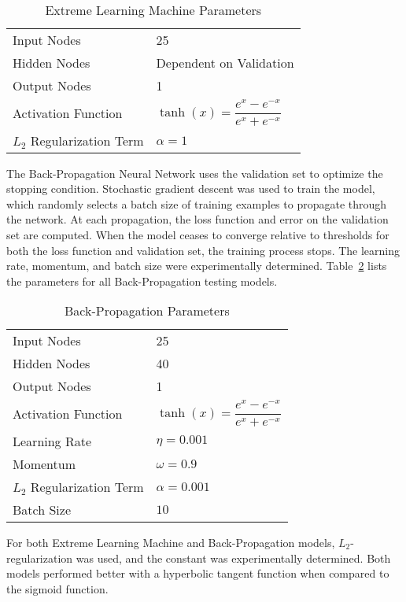 \begin{table}
\caption{Extreme Learning Machine Parameters}
\label{tab:elm-param}
	\begin{tabular}{ll}
	\toprule
	Input Nodes			   & 25 \\
	Hidden Nodes           & Dependent on Validation \\
	Output Nodes		   & 1 \\
	Activation Function    & $\tanh(x)=\dfrac{e^x - e^{-x}}{e^x + e^{-x}}$\\
	$L_2$ Regularization Term & $\alpha=1$\\
	\bottomrule
	\end{tabular}
\end{table}

The Back-Propagation Neural Network uses the validation set to optimize the stopping condition.
Stochastic gradient descent was used to train the model, which randomly selects a batch size of training examples to propagate through the network.
At each propagation, the loss function and error on the validation set are computed.
When the model ceases to converge relative to thresholds for both the loss function and validation set, the training process stops.
The learning rate, momentum, and batch size were experimentally determined.
Table~\ref{tab:bp-param} lists the parameters for all Back-Propagation testing models.

\begin{table}
\caption{Back-Propagation Parameters}
\label{tab:bp-param}
	\begin{tabular}{ll}
	\toprule
	Input Nodes			   & 25 \\
	Hidden Nodes           & 40 \\
	Output Nodes		   & 1 \\
	Activation Function    & $\tanh(x)=\dfrac{e^x - e^{-x}}{e^x + e^{-x}}$\\
	Learning Rate          & $\eta=0.001$\\
	Momentum               & $\omega=0.9$\\
	$L_2$ Regularization Term & $\alpha=0.001$\\
	Batch Size             & $10$ \\
	\bottomrule
	\end{tabular}
\end{table}

For both Extreme Learning Machine and Back-Propagation models, $L_2$-regularization was used, and the constant was experimentally determined.
Both models performed better with a hyperbolic tangent function when compared to the sigmoid function.


